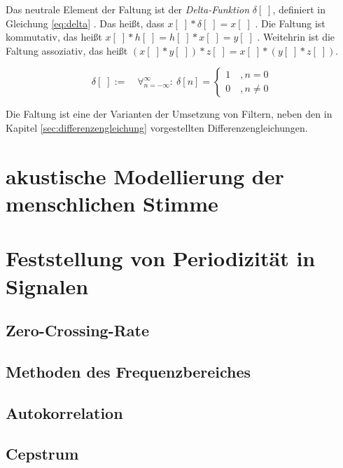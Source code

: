 Das neutrale Element der Faltung ist der \emph{Delta-Funktion} $\delta[\;]$, definiert in Gleichung \ref{eq:delta} . Das heißt, dass $x[\;] * \delta[\;] = x[\;]$ . Die Faltung ist kommutativ, das heißt $ x[\;]* h[\;] = h[\;] * x[\;] = y[\;]$ . \cite[S. 107, 113 ]{dspGuide} Weitehrin ist die Faltung assoziativ, das heißt $(x[\;]*y[\;])*z[\;]=x[\;]*(y[\;]*z[\;])$. \cite[S. 133]{dspGuide}

\begin{equation}
\delta [\;] := \quad \mathop{\forall}_{n = -\infty}^{\infty} :\ \delta[n] = 
\begin{cases}
1 \quad , n = 0\\
0 \quad ,  n \neq 0
\label{eq:delta}
\end{cases}
\end{equation}

Die Faltung ist eine der Varianten der Umsetzung von Filtern, neben den in Kapitel \ref{sec:differenzengleichung} vorgestellten Differenzengleichungen.


\section{akustische Modellierung der menschlichen Stimme}
\section{Feststellung von Periodizität in Signalen}
\subsection{Zero-Crossing-Rate}
\subsection{Methoden des Frequenzbereiches}
\subsection{Autokorrelation}
\subsection{Cepstrum}